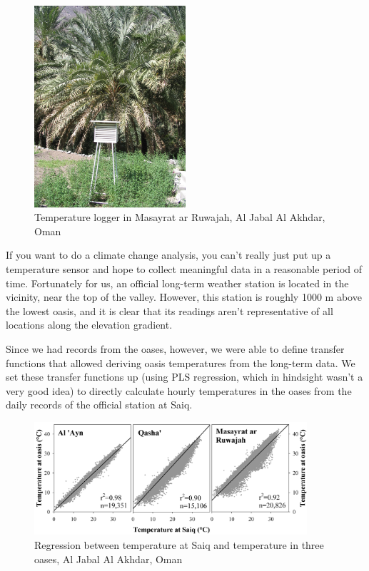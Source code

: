 \documentclass[
]{book}
\begin{document}
\begin{figure}
\centering
\includegraphics[width=0.5\textwidth,height=\textheight]{pictures/IMG_5298.JPG}
\caption{Temperature logger in Masayrat ar Ruwajah, Al Jabal Al Akhdar, Oman}
\end{figure}

If you want to do a climate change analysis, you can't really just put up a temperature sensor and hope to collect meaningful data in a reasonable period of time. Fortunately for us, an official long-term weather station is located in the vicinity, near the top of the valley. However, this station is roughly 1000 m above the lowest oasis, and it is clear that its readings aren't representative of all locations along the elevation gradient.

Since we had records from the oases, however, we were able to define transfer functions that allowed deriving oasis temperatures from the long-term data. We set these transfer functions up (using PLS regression, which in hindsight wasn't a very good idea) to directly calculate hourly temperatures in the oases from the daily records of the official station at Saiq.

\begin{figure}
\centering
\includegraphics[width=0.9\textwidth,height=\textheight]{pictures/Luedeling_JPG_Figure_02_Hourly_regressions.JPG}
\caption{Regression between temperature at Saiq and temperature in three oases, Al Jabal Al Akhdar, Oman}
\end{figure}
\end{document}
